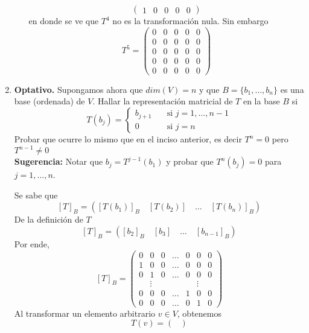 \begin{enumerate}
\begin{enumerate}
\begin{mdframed}[style=s]
\[\begin{pmatrix}
                            1&0&0&0&0
                        \end{pmatrix}\]
                        en donde se ve que $T^4$ no es la transformación nula. Sin embargo\[T^5=\begin{pmatrix}
                            0&0&0&0&0\\
                            0&0&0&0&0\\
                            0&0&0&0&0\\
                            0&0&0&0&0\\
                            0&0&0&0&0
                        \end{pmatrix}\]
                    \end{mdframed}
            \end{enumerate}
        \item \textbf{Optativo.} Supongamos ahora que $dim(V)=n$ y que $B=\{b_1,\dots,b_n\}$ es una base (ordenada) de $V$. Hallar la representación matricial de $T$ en la base $B$ si \[T(b_j)=\begin{cases}
                b_{j+1}\quad&\text{si }j=1,\dots,n-1\\
                0 &\text{si }j=n
            \end{cases}\]
            Probar que ocurre lo mismo que en el inciso anterior, es decir $T^n=0$ pero $T^{n-1}\neq0$\\
            \textbf{Sugerencia:} Notar que $b_j=T^{j-1}(b_1)$ y probar que $T^n(b_j)=0$ para $j=1,\dots,n$.
            \begin{mdframed}[style=s]
                Se sabe que \[[T]_B=\left([T(b_1)]_B\quad[T(b_2)]\quad\dots\quad[T(b_n)]_B\right)\]
                De la definición de $T$\[[T]_B=\left([b_2]_B\quad[b_3]\quad\dots\quad[b_{n-1}]_B\right)\]
                Por ende, \[[T]_B=\begin{pmatrix}
                    0&0&0&\dots&0&0&0\\
                    1&0&0&\dots&0&0&0\\
                    0&1&0&\dots&0&0&0\\
                    &\vdots&&&&\vdots&\\
                    0&0&0&\dots&1&0&0\\
                    0&0&0&\dots&0&1&0
                \end{pmatrix}\]
                Al transformar un elemento arbitrario $v\in V$, obtenemos\[T(v)=\begin{pmatrix}

\end{pmatrix}\]
\end{mdframed}
\end{enumerate}

